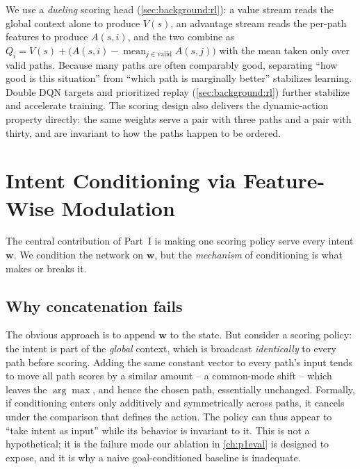 We use a \emph{dueling} scoring head (\cref{sec:background:rl}): a value stream reads the global context
alone to produce $V(s)$, an advantage stream reads the per-path features to produce $A(s, i)$, and the
two combine as $Q_i = V(s) + \big(A(s,i) - \operatorname{mean}_{j\in\text{valid}} A(s,j)\big)$ with the
mean taken only over valid paths. Because many paths are often comparably good, separating ``how good is
this situation'' from ``which path is marginally better'' stabilizes learning. Double DQN targets and
prioritized replay (\cref{sec:background:rl}) further stabilize and accelerate training. The scoring
design also delivers the dynamic-action property directly: the same weights serve a pair with three
paths and a pair with thirty, and are invariant to how the paths happen to be ordered.

\section{Intent Conditioning via Feature-Wise Modulation}
\label{sec:p1design:film}

The central contribution of Part~I is making one scoring policy serve every intent $\mathbf{w}$. We
condition the network on $\mathbf{w}$, but the \emph{mechanism} of conditioning is what makes or breaks
it.

\subsection{Why concatenation fails}
\label{sec:p1design:concat}
The obvious approach is to append $\mathbf{w}$ to the state. But consider a scoring policy: the intent
is part of the \emph{global} context, which is broadcast \emph{identically} to every path before
scoring. Adding the same constant vector to every path's input tends to move all path scores by a
similar amount -- a common-mode shift -- which leaves the $\arg\max$, and hence the chosen path,
essentially unchanged. Formally, if conditioning enters only additively and symmetrically across paths,
it cancels under the comparison that defines the action. The policy can thus appear to ``take intent as
input'' while its behavior is invariant to it. This is not a hypothetical; it is the failure mode our
ablation in \cref{ch:p1eval} is designed to expose, and it is why a naive goal-conditioned baseline is
inadequate.

